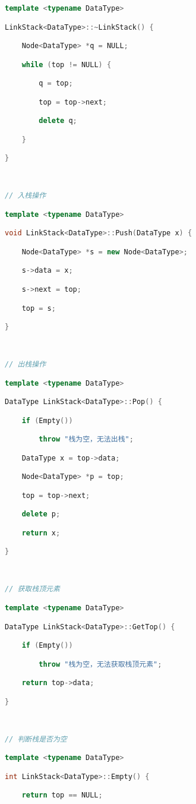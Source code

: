 \begin{lstlisting}[language=C++]
template <typename DataType>

LinkStack<DataType>::~LinkStack() {

    Node<DataType> *q = NULL;

    while (top != NULL) {

        q = top;

        top = top->next;

        delete q;

    }

}

  

// 入栈操作

template <typename DataType>

void LinkStack<DataType>::Push(DataType x) {

    Node<DataType> *s = new Node<DataType>;

    s->data = x;

    s->next = top;

    top = s;

}

  

// 出栈操作

template <typename DataType>

DataType LinkStack<DataType>::Pop() {

    if (Empty())

        throw "栈为空，无法出栈";

    DataType x = top->data;

    Node<DataType> *p = top;

    top = top->next;

    delete p;

    return x;

}

  

// 获取栈顶元素

template <typename DataType>

DataType LinkStack<DataType>::GetTop() {

    if (Empty())

        throw "栈为空，无法获取栈顶元素";

    return top->data;

}

  

// 判断栈是否为空

template <typename DataType>

int LinkStack<DataType>::Empty() {

    return top == NULL;


\end{lstlisting}
